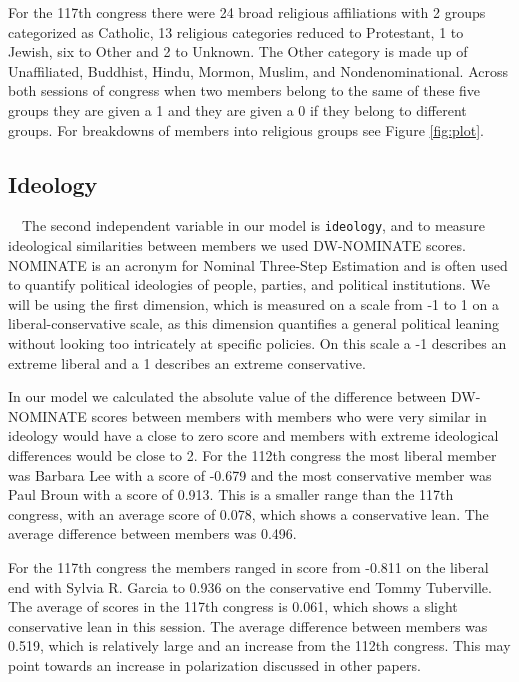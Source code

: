 \documentclass[Royal,times,sageh]{sagej}
\begin{document}
For the 117th congress there were 24 broad religious affiliations with 2 groups categorized as Catholic, 13 religious categories reduced to Protestant, 1 to Jewish, six to Other and 2 to Unknown. The Other category is made up of Unaffiliated, Buddhist, Hindu, Mormon, Muslim, and Nondenominational.
Across both sessions of congress when two members belong to the same of these five groups they are given a 1 and they are given a 0 if they belong to different groups. For breakdowns of members into religious groups see Figure \ref{fig:plot}.

\hypertarget{ideology}{%
\subsection{Ideology}\label{ideology}}

\doublespacing

~~The second independent variable in our model is \texttt{ideology}, and to measure ideological similarities between members we used DW-NOMINATE scores. NOMINATE is an acronym for Nominal Three-Step Estimation and is often used to quantify political ideologies of people, parties, and political institutions. We will be using the first dimension, which is measured on a scale from -1 to 1 on a liberal-conservative scale, as this dimension quantifies a general political leaning without looking too intricately at specific policies. On this scale a -1 describes an extreme liberal and a 1 describes an extreme conservative.

In our model we calculated the absolute value of the difference between DW-NOMINATE scores between members with members who were very similar in ideology would have a close to zero score and members with extreme ideological differences would be close to 2.
For the 112th congress the most liberal member was Barbara Lee with a score of -0.679 and the most conservative member was Paul Broun with a score of 0.913. This is a smaller range than the 117th congress, with an average score of 0.078, which shows a conservative lean. The average difference between members was 0.496.

For the 117th congress the members ranged in score from -0.811 on the liberal end with Sylvia R. Garcia to 0.936 on the conservative end Tommy Tuberville. The average of scores in the 117th congress is 0.061, which shows a slight conservative lean in this session. The average difference between members was 0.519, which is relatively large and an increase from the 112th congress. This may point towards an increase in polarization discussed in other papers.
\end{document}
